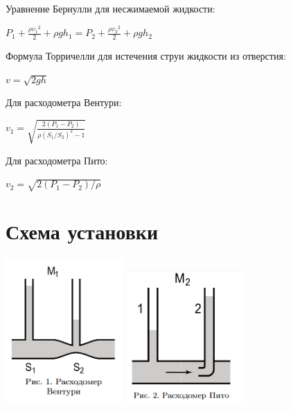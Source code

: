 \documentclass{article}
\begin{document}
Уравнение Бернулли для несжимаемой жидкости:

\begin{center}
$ P{}_1{} + \frac {\rho v{}_1{}^2}{2} + \rho gh{}_1{} = P{}_2{} + \frac {\rho v{}_2{}^2}{2} + \rho gh{}_2{} $
\end{center}

Формула Торричелли для истечения струи жидкости из отверстия:
\begin{center}
$ v=\sqrt{2gh} $
\end{center}

Для расходометра Вентури:
\begin{center}
$ v{}_1{}=\sqrt{\frac{2(P{}_1{}-P{}_2{})}{\rho (S{}_1{}/S{}_2{})^2-1}} $
\end{center}

Для расходометра Пито:
\begin{center}
$ v{}_2{}=\sqrt{2(P{}_1{}-P{}_2{})/\rho} $
\end{center}

\section{Схема установки}


\begin{multicols}{2}

\hfill
\includegraphics[width=45mm]{ventoury.PNG}
\includegraphics[width=45mm]{pitaux.PNG}
\hfill
\label{figRight}
\end{multicols}
\end{document}
